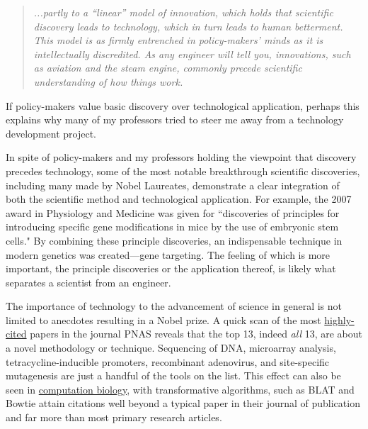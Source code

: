     \begin{quote} 
      \itshape 
      \singlespacing
      ...partly to a ``linear'' model of innovation, which holds that scientific discovery leads to technology, which in turn leads to human betterment. This model is as firmly entrenched in policy-makers' minds as it is intellectually discredited. As any engineer will tell you, innovations, such as aviation and the steam engine, commonly precede scientific understanding of how things work.
      \end{quote} 

    If policy-makers value basic discovery over technological application, perhaps this explains why many of my professors tried to steer me away from a technology development project.

    In spite of policy-makers and my professors holding the viewpoint that discovery precedes technology, some of the most notable breakthrough scientific discoveries, including many made by Nobel Laureates, demonstrate a clear integration of both the scientific method and technological application. For example, the 2007 award in Physiology and Medicine was given for ``discoveries of principles for introducing specific gene modifications in mice by the use of embryonic stem cells."  By combining these principle discoveries, an indispensable technique in modern genetics was created---gene targeting. The feeling of which is more important, the principle discoveries or the application thereof, is likely what separates a scientist from an engineer.

    The importance of technology to the advancement of science in general is not limited to anecdotes resulting in a Nobel prize. A quick scan of the most \href{http://www.pnas.org/reports/most-cited}{highly-cited} papers in the journal PNAS reveals that the top 13, indeed \textit{all} 13, are about a novel methodology or technique. Sequencing of DNA, microarray analysis, tetracycline-inducible promoters, recombinant adenovirus, and site-specific mutagenesis are just a handful of the tools on the list. This effect can also be seen in \href{http://simplystatistics.org/2014/04/07/writing-good-software-can-have-more-impact-than-publishing-in-high-impact-journals-for-genomic-statisticians/}{computation biology}, with transformative algorithms, such as BLAT \citep{Altschul1990} and Bowtie \citep{Langmead2009} attain citations well beyond a typical paper in their journal of publication and far more than most primary research articles.    

